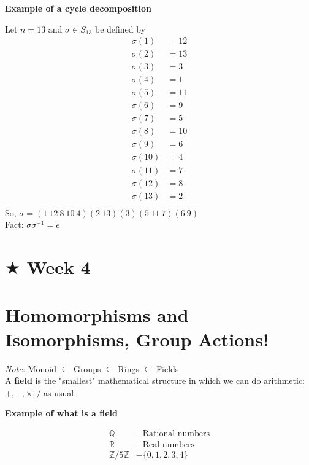 \documentclass{article}
\begin{document}
\newpage
\centerline{\textbf{Example of a cycle decomposition}}
Let \(n=13\) and \(\sigma \in S_{13}\) be defined by
\begin{align*}
    \sigma(1)&=12\\
    \sigma(2)&=13\\
    \sigma(3)&=3\\
    \sigma(4)&=1\\
    \sigma(5)&=11\\
    \sigma(6)&=9\\
    \sigma(7)&=5\\
    \sigma(8)&=10\\
    \sigma(9)&=6\\
    \sigma(10)&=4\\
    \sigma(11)&=7\\
    \sigma(12)&=8\\
    \sigma(13)&=2\\
\end{align*}
So, \(\sigma=(1\ 12\ 8\ 10\ 4)(2\ 13)(3)(5\ 11\ 7)(6\ 9)\)\\
\underline{Fact:} \(\sigma \sigma^{-1}=e\)\\

\newpage
\section*{$\bigstar$ Week 4}
\section*{Homomorphisms and Isomorphisms, Group Actions!}

\textit{Note:} Monoid \(\subseteq\) Groups \(\subseteq\) Rings \(\subseteq\) Fields\\

 A \textbf{field} is the "smallest" mathematical structure in which we can do arithmetic: \(+, -, \times,/\) as usual.\\[0.5cm]

\centerline{\textbf{Example of what is a field}}
\begin{align*}
    \mathbb{Q} &-\text{Rational numbers}\\
    \mathbb{R} &-\text{Real numbers}\\
    \mathbb{Z}/5\mathbb{Z} &-\{0,1,2,3,4\}
\end{align*}\\[0.5cm]
\end{document}
